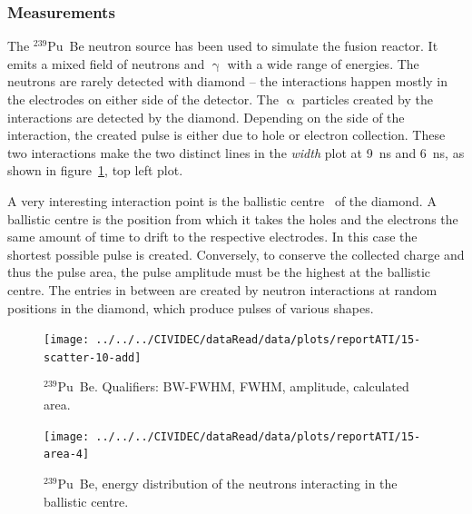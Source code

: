 \subsubsection{Measurements}
The $^{239}$Pu~Be neutron source has been used to simulate the fusion reactor. It emits a mixed field of neutrons and $\upgamma$ with a wide range of energies. The neutrons are rarely detected with diamond -- the interactions happen mostly in the electrodes on either side of the detector. The $\upalpha$ particles created by the interactions are detected by the diamond. Depending on the side of the interaction, the created pulse is either due to hole or electron collection. These two interactions make the two distinct lines in the \emph{width} plot at 9~ns and 6~ns, as shown in figure~\ref{fig:scatterpu}, top left plot. 

A very interesting interaction point is the ballistic centre~\cite{PAVEL:00001, CHRISSI:00005} of the diamond. A ballistic centre is the position from which it takes the holes and the electrons the same amount of time to drift to the respective electrodes. In this case the shortest possible pulse is created. Conversely, to conserve the collected charge and thus the pulse area, the pulse amplitude must be the highest at the ballistic centre. The entries in between are created by neutron interactions at random positions in the diamond, which produce pulses of various shapes. 


\clearpage
\begin{figure}[]
\centering
\texttt{[image: ../../../CIVIDEC/dataRead/data/plots/reportATI/15-scatter-10-add]}
\caption{$^{239}$Pu~Be. Qualifiers: BW-FWHM, FWHM, amplitude, calculated area.}
\label{fig:scatterpu}
\end{figure}

\clearpage
\begin{figure}[!t]
\centering
\texttt{[image: ../../../CIVIDEC/dataRead/data/plots/reportATI/15-area-4]}
\caption{$^{239}$Pu~Be, energy distribution of the neutrons interacting in the ballistic centre.}
\label{fig:scatterpuarea}
\end{figure}

